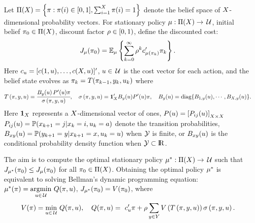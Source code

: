 \documentclass[draftcls,onecolumn]{IEEEtran}
\begin{document}
Let
$\Pi(X) = \left\{\pi: \pi(i) \in [0,1], \sum_{i=1}^X \pi(i) = 1 \right\}$ denote the belief space of $X$-dimensional probability vectors.  For stationary policy  $\mu: \Pi(X) \rightarrow \,\mathcal{U}$,
 initial belief  $\pi_0\in \Pi(X)$,  discount factor $\rho \in [0,1)$, define the  discounted cost:
\begin{align}\label{eq:discountedcost}
J_{\mu}(\pi_0) = \Bbb{E}_{\mu}\left\{\sum_{k=0}^{\infty} \rho ^{k} c_{\mu(\pi_k)}^\prime\pi_k\right\}.
\end{align}
Here $c_u = [c(1,u),\ldots,c(X,u)]^\prime$, $u\in \,\mathcal{U}$ is the cost vector for each action, and the belief state evolves as
$\pi_{k} = T(\pi_{k-1},y_k,u_k)$ where
\begin{align}  T\left(\pi,y,u\right) = \cfrac{B_{y} (u)\, P^\prime(u)\pi}{\sigma\left(\pi,y,u\right)} , \quad
\sigma\left(\pi,y,u\right) = \mathbf{1}_{X}'B_{y}(u) P^\prime(u)\pi, \quad
B_{y}(u) = \textnormal{diag}\{B_{1,y}(u),\cdots,B_{X,y}(u)\}. \label{eq:information_state}
\end{align}
Here  $\mathbf{1}_{X}$ represents a $X$-dimensional vector of ones,
$ P(u) = \left[P_{ij}(u)\right]_{X\times X}$
$ P_{ij}(u) = \mathbb{P}(x_{k+1} = j | x_k = i, u_k = a )$ denote the transition probabilities,
 $B_{xy}(u) = \mathbb{P}(y_{k+1} = y| x_{k+1} = x, u_{k} = u)$ when $\mathcal{Y}$ is finite,
 or  $B_{xy}(u)$ is the conditional probability density function when $\obspace \subset \reals$.


The aim is to compute the optimal  stationary policy $\mu^*:\Pi(X) \rightarrow \,\mathcal{U}$ such that
$J_{\mu^*}(\pi_0) \leq J_{\mu}(\pi_0)$ for all $\pi_0 \in \Pi(X)$.
Obtaining the optimal policy  $\mu^*$ is equivalent to solving
 Bellman's  dynamic programming equation:
$ \optpolicy(\belief) =  \underset{\action \in \actionspace}\argmin~ Q(\belief,\action)$, $J_{\mu^*}(\pi_0) = V(\pi_0)$, where
\begin{equation}
V(\pi)  = \underset{u \in \,\mathcal{U}}\min ~Q(\pi,u), \quad
  Q(\pi,u) =  ~c_u^\prime\pi + \rho\sum_{y \in {Y}} V\left(T\left(\pi,y,u\right)\right)\sigma \left(\pi,y,u\right). \label{eq:bellman}
\end{equation}
\end{document}
